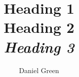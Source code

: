 \documentclass[12pt, pdftex]{article}
\title{
	\vspace{2in}
	\textmd{\textbf{Heading 1}}\\
	\normalsize\vspace{0.1in}\small{Heading 2}\\
	\vspace{0.1in}
	\large{\textit{Heading 3}}\\
	\vspace{3in}
}
\author{Daniel Green}
\begin{document}
\maketitle
\clearpage

\tableofcontents
\clearpage



\clearpage


\clearpage


\clearpage


\clearpage


\clearpage

\begin{appendices}

\end{appendices}

\newpage

\end{document}
